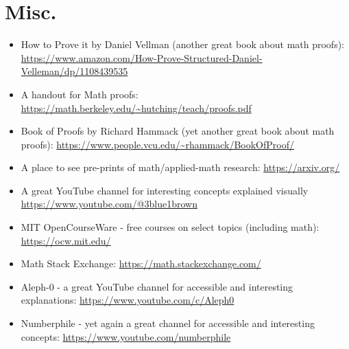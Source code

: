 \section{Misc.}
\begin{itemize}
\item How to Prove it by Daniel Vellman (another great book about math proofs): \url{https://www.amazon.com/How-Prove-Structured-Daniel-Velleman/dp/1108439535}
\item A handout for Math proofs: \url{https://math.berkeley.edu/~hutching/teach/proofs.pdf}
\item Book of Proofs by Richard Hammack (yet another great book about math proofs): \url{https://www.people.vcu.edu/~rhammack/BookOfProof/}
    \item A place to see pre-prints of math/applied-math research: \url{https://arxiv.org/}
    \item A great YouTube channel for interesting concepts explained visually \url{https://www.youtube.com/@3blue1brown}
    \item MIT OpenCourseWare - free courses on select topics (including math): \url{https://ocw.mit.edu/}
    \item Math Stack Exchange: \url{https://math.stackexchange.com/}
    \item Aleph-0 - a great YouTube channel for accessible and interesting explanations: \url{https://www.youtube.com/c/Aleph0}
    \item Numberphile - yet again a great channel for accessible and interesting concepts:
    \url{https://www.youtube.com/numberphile}
\end{itemize}